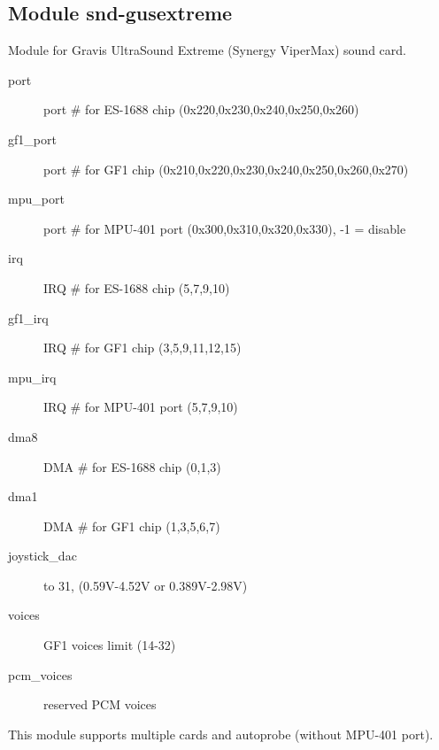 \documentclass[a4paper,8pt,english]{sphinxmanual}
\begin{document}
\subsection{Module snd-gusextreme}
\label{sound/alsa-configuration:module-snd-gusextreme}
Module for Gravis UltraSound Extreme (Synergy ViperMax) sound card.
\begin{description}
\item[{port}] \leavevmode
port \# for ES-1688 chip (0x220,0x230,0x240,0x250,0x260)

\item[{gf1\_port}] \leavevmode
port \# for GF1 chip (0x210,0x220,0x230,0x240,0x250,0x260,0x270)

\item[{mpu\_port}] \leavevmode
port \# for MPU-401 port (0x300,0x310,0x320,0x330), -1 = disable

\item[{irq}] \leavevmode
IRQ \# for ES-1688 chip (5,7,9,10)

\item[{gf1\_irq}] \leavevmode
IRQ \# for GF1 chip (3,5,9,11,12,15)

\item[{mpu\_irq}] \leavevmode
IRQ \# for MPU-401 port (5,7,9,10)

\item[{dma8}] \leavevmode
DMA \# for ES-1688 chip (0,1,3)

\item[{dma1}] \leavevmode
DMA \# for GF1 chip (1,3,5,6,7)

\item[{joystick\_dac}]  to 31, (0.59V-4.52V or 0.389V-2.98V)

\item[{voices}] \leavevmode
GF1 voices limit (14-32)

\item[{pcm\_voices}] \leavevmode
reserved PCM voices

\end{description}

This module supports multiple cards and autoprobe (without MPU-401 port).
\end{document}
